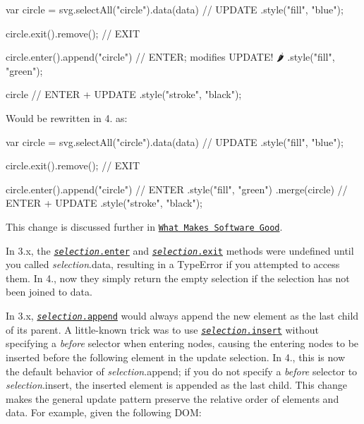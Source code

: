 \begin{DoxyCode}
var circle = svg.selectAll("circle").data(data) // UPDATE
    .style("fill", "blue");

circle.exit().remove(); // EXIT

circle.enter().append("circle") // ENTER; modifies UPDATE! 🌶
    .style("fill", "green");

circle // ENTER + UPDATE
    .style("stroke", "black");
\end{DoxyCode}


Would be rewritten in 4. as\+:


\begin{DoxyCode}
var circle = svg.selectAll("circle").data(data) // UPDATE
    .style("fill", "blue");

circle.exit().remove(); // EXIT

circle.enter().append("circle") // ENTER
    .style("fill", "green")
  .merge(circle) // ENTER + UPDATE
    .style("stroke", "black");
\end{DoxyCode}


This change is discussed further in \href{https://medium.com/@mbostock/what-makes-software-good-943557f8a488}{\tt What Makes Software Good}.

In 3.\+x, the \href{https://github.com/d3/d3-selection/blob/master/README.md#selection_enter}{\tt {\itshape selection}.enter} and \href{https://github.com/d3/d3-selection/blob/master/README.md#selection_exit}{\tt {\itshape selection}.exit} methods were undefined until you called {\itshape selection}.data, resulting in a Type\+Error if you attempted to access them. In 4., now they simply return the empty selection if the selection has not been joined to data.

In 3.\+x, \href{https://github.com/d3/d3-selection/blob/master/README.md#selection_append}{\tt {\itshape selection}.append} would always append the new element as the last child of its parent. A little-\/known trick was to use \href{https://github.com/d3/d3-selection/blob/master/README.md#selection_insert}{\tt {\itshape selection}.insert} without specifying a {\itshape before} selector when entering nodes, causing the entering nodes to be inserted before the following element in the update selection. In 4., this is now the default behavior of {\itshape selection}.append; if you do not specify a {\itshape before} selector to {\itshape selection}.insert, the inserted element is appended as the last child. This change makes the general update pattern preserve the relative order of elements and data. For example, given the following D\+OM\+:


